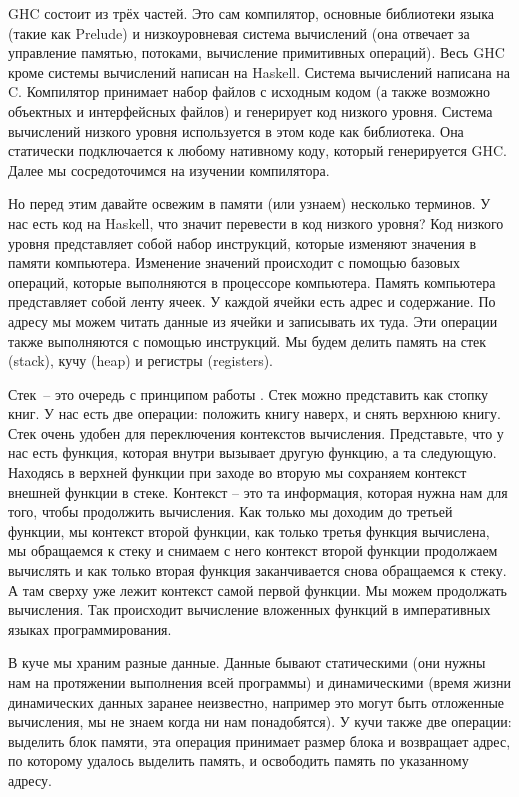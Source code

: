 GHC состоит из трёх частей. Это сам компилятор, основные
библиотеки языка (такие как Prelude) и низкоуровневая 
система вычислений (она отвечает за управление памятью, 
потоками, вычисление примитивных операций). 
Весь GHC кроме системы вычислений
написан на Haskell. Система вычислений написана на C.
Компилятор принимает набор файлов с исходным кодом 
(а также возможно объектных и интерфейсных файлов) 
и генерирует код низкого уровня. Система вычислений низкого уровня
используется в этом коде как библиотека. Она статически 
подключается к любому нативному коду, который генерируется GHC. 
Далее мы сосредоточимся на изучении компилятора. 

Но перед этим давайте освежим в памяти (или узнаем)
несколько терминов. У нас есть код на Haskell, что значит
перевести в код низкого уровня? Код низкого уровня представляет
собой набор инструкций, которые изменяют значения в памяти
компьютера. Изменение значений происходит с помощью 
базовых операций, которые выполняются в процессоре компьютера.
Память компьютера представляет собой ленту ячеек. У каждой
ячейки есть адрес и содержание. По адресу мы можем читать
данные из ячейки и записывать их туда. Эти операции также
выполняются с помощью инструкций. 
Мы будем делить память на стек (stack), кучу (heap) и 
регистры (registers). 

Стек~-- это очередь с 
принципом работы .
Стек можно представить как стопку книг. У нас есть две
операции: положить книгу наверх, и снять верхнюю книгу.
Стек очень удобен для переключения контекстов вычисления.
Представьте, что у нас есть функция, которая внутри 
вызывает другую функцию, а та следующую. Находясь в 
верхней функции при заходе во вторую мы сохраняем контекст
внешней функции в стеке. Контекст -- это та информация, которая
нужна нам для того, чтобы продолжить вычисления. 
Как только мы доходим до третьей функции, мы  контекст второй функции, как только третья функция вычислена,
мы обращаемся к стеку и снимаем с него контекст второй функции
продолжаем вычислять и как только вторая функция заканчивается
снова обращаемся к стеку. А там сверху уже лежит контекст 
самой первой функции. Мы можем продолжать вычисления. Так 
происходит вычисление вложенных функций в императивных 
языках программирования. 

В куче мы храним разные данные. Данные бывают статическими
(они нужны нам на протяжении выполнения всей программы)
и динамическими (время жизни динамических данных заранее
неизвестно, например это могут быть отложенные вычисления,
мы не знаем когда ни нам понадобятся).
У кучи также две операции: выделить блок памяти, эта операция
принимает размер блока и возвращает адрес, по которому
удалось выделить память, и освободить память по указанному адресу.

